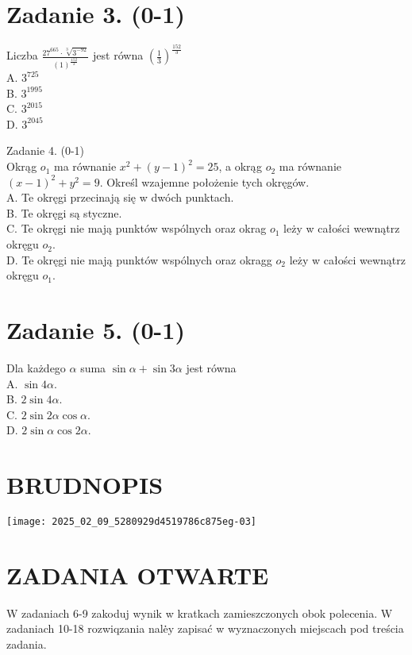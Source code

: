 \documentclass[10pt]{article}
\begin{document}
\section*{Zadanie 3. (0-1)}
Liczba \(\frac{27^{665} \cdot \sqrt[3]{3^{-92}}}{(1)^{\frac{152}{2}}}\) jest równa \(\left(\frac{1}{3}\right)^{\frac{152}{3}}\)\\
A. \(3^{725}\)\\
B. \(3^{1995}\)\\
C. \(3^{2015}\)\\
D. \(3^{2045}\)

Zadanie 4. (0-1)\\
Okrąg \(o_{1}\) ma równanie \(x^{2}+(y-1)^{2}=25\), a okrąg \(o_{2}\) ma równanie \((x-1)^{2}+y^{2}=9\). Określ wzajemne położenie tych okręgów.\\
A. Te okręgi przecinają się w dwóch punktach.\\
B. Te okręgi są styczne.\\
C. Te okręgi nie mają punktów wspólnych oraz okrag \(o_{1}\) leży w całości wewnątrz okręgu \(o_{2}\).\\
D. Te okręgi nie mają punktów wspólnych oraz okragg \(o_{2}\) leży w całości wewnątrz okręgu \(o_{1}\).

\section*{Zadanie 5. (0-1)}
Dla każdego \(\alpha\) suma \(\sin \alpha+\sin 3 \alpha\) jest równa\\
A. \(\sin 4 \alpha\).\\
B. \(2 \sin 4 \alpha\).\\
C. \(2 \sin 2 \alpha \cos \alpha\).\\
D. \(2 \sin \alpha \cos 2 \alpha\).

\section*{BRUDNOPIS}
\begin{center}
\texttt{[image: 2025\_02\_09\_5280929d4519786c875eg-03]}
\end{center}

\section*{ZADANIA OTWARTE}
W zadaniach 6-9 zakoduj wynik w kratkach zamieszczonych obok polecenia. W zadaniach 10-18 rozwiqzania nalė̇y zapisać w wyznaczonych miejscach pod treścia zadania.
\end{document}
